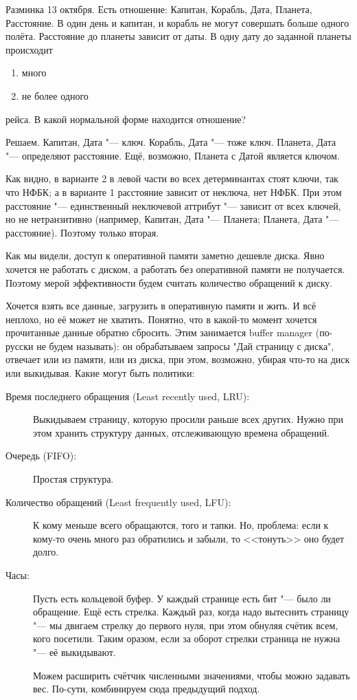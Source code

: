 \begin{Rem}
	Разминка 13 октября.
	Есть отношение: Капитан, Корабль, Дата, Планета, Расстояние.
	В один день и капитан, и корабль не могут совершать больше одного полёта.
	Расстояние до планеты зависит от даты.
	В одну дату до заданной планеты происходит
	\begin{enumerate}
	\item много
	\item не более одного
	\end{enumerate}
	рейса.
	В какой нормальной форме находится отношение?

	Решаем.
	Капитан, Дата "--- ключ.
	Корабль, Дата "--- тоже ключ.
	Планета, Дата "--- определяют расстояние.
	Ещё, возможно, Планета с Датой является ключом.

	Как видно, в варианте 2 в левой части во всех детерминантах стоят ключи, так что НФБК;
	а в варианте 1 расстояние зависит от неключа, нет НФБК.
	При этом расстояние "--- единственный неключевой аттрибут "--- зависит от всех ключей, но не нетранзитивно
	(например, Капитан, Дата "--- Планета; Планета, Дата "--- расстояние). Поэтому только вторая.
\end{Rem}

Как мы видели, доступ к оперативной памяти заметно дешевле диска.
Явно хочется не работать с диском, а работать без оперативной памяти не получается.
Поэтому мерой эффективности будем считать количество обращений к диску.

Хочется взять все данные, загрузить в оперативную памяти и жить.
И всё неплохо, но её может не хватить.
Понятно, что в какой-то момент хочется прочитанные данные обратно сбросить.
Этим занимается buffer manager (по-русски не будем называть):
он обрабатываем запросы "Дай страницу с диска", отвечает или из памяти, или из диска, при этом, возможно, убирая что-то на диск или выкидывая.
Какие могут быть политики:
\begin{description}
\item[Время последнего обращения (Least recently used, LRU):]
	Выкидываем страницу, которую просили раньше всех других.
	Нужно при этом хранить структуру данных, отслеживающую времена обращений.

\item[Очередь (FIFO):]
	Простая структура.

\item[Количество обращений (Least frequently used, LFU):]
	К кому меньше всего обращаются, того и тапки.
	Но, проблема: если к кому-то очень много раз обратились и забыли, то <<тонуть>> оно будет долго.

\item[Часы:]
	Пусть есть кольцевой буфер.
	У каждый странице есть бит "--- было ли обращение.
	Ещё есть стрелка.
	Каждый раз, когда надо вытеснить страницу "--- мы двигаем стрелку до первого нуля, при этом обнуляя счётик всем, кого посетили.
	Таким оразом, если за оборот стрелки страница не нужна "--- её выкидывают.

	Можем расширить счётчик численными значениями, чтобы можно задавать вес.
	По-сути, комбинируем сюда предыдущий подход.
\end{description}

